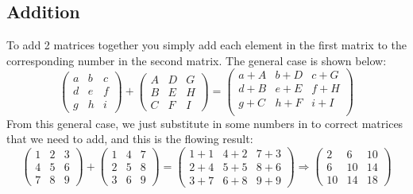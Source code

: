 \documentclass{article}
\begin{document}
\subsection{Addition}
To add 2 matrices together you simply add each element in the first matrix to the corresponding number in the second matrix. The general case is shown below:
\begin{equation*}
	\begin{pmatrix}
		a & b & c\\
		d & e & f\\
		g & h & i
	\end{pmatrix}
	+
	\begin{pmatrix}
		A & D & G\\
		B & E & H\\
		C & F & I
	\end{pmatrix}
	=
	\begin{pmatrix}
		a+A & b+D & c+G\\
		d+B & e+E & f+H\\
		g+C & h+F & i+I\\
	\end{pmatrix}
\end{equation*}
From this general case, we just substitute in some numbers in to correct matrices that we need to add, and this is the flowing  result:
\begin{equation*}
	\begin{pmatrix}
		1 & 2 & 3\\
		4 & 5 & 6\\
		7 & 8 & 9
	\end{pmatrix}
	+
	\begin{pmatrix}
		1 & 4 & 7\\
		2 & 5 & 8\\
		3 & 6 & 9
	\end{pmatrix}
	=
	\begin{pmatrix}
		1+1 & 4+2 & 7+3\\
		2+4 & 5+5 & 8+6\\
		3+7 & 6+8 & 9+9
	\end{pmatrix}
	\Rightarrow
	\begin{pmatrix}
		2 & 6 & 10\\
		6 & 10 & 14\\
		10 & 14 & 18
	\end{pmatrix}
\end{equation*}
\end{document}
